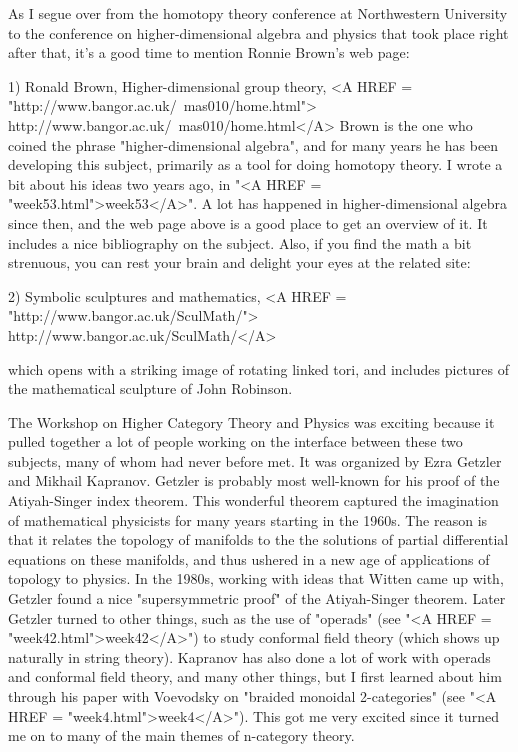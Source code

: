 

As I segue over from the homotopy theory conference at Northwestern
University to the conference on higher-dimensional algebra and physics
that took place right after that, it's a good time to mention Ronnie
Brown's web page:

1) Ronald Brown, Higher-dimensional group theory,
<A HREF = "http://www.bangor.ac.uk/~mas010/home.html">
http://www.bangor.ac.uk/~mas010/home.html</A>
Brown is the one who coined the phrase "higher-dimensional algebra", and
for many years he has been developing this subject, primarily as a tool
for doing homotopy theory.  I wrote a bit about his ideas two years ago,
in "<A HREF = "week53.html">week53</A>".  A lot has happened in higher-dimensional algebra since
then, and the web page above is a good place to get an overview of it.
It includes a nice bibliography on the subject.  Also, if you find the
math a bit strenuous, you can rest your brain and delight your eyes at
the related site:

2) Symbolic sculptures and mathematics,
<A HREF = "http://www.bangor.ac.uk/SculMath/">
http://www.bangor.ac.uk/SculMath/</A>

which opens with a striking image of rotating linked tori, and includes
pictures of the mathematical sculpture of John Robinson.

The Workshop on Higher Category Theory and Physics was exciting because
it pulled together a lot of people working on the interface between
these two subjects, many of whom had never before met.  It was organized
by Ezra Getzler and Mikhail Kapranov.  Getzler is probably most well-known
for his proof of the Atiyah-Singer index theorem.  This wonderful
theorem captured the imagination of mathematical physicists for many
years starting in the 1960s.  The reason is that it relates the topology
of manifolds to the the solutions of partial differential equations
on these manifolds, and thus ushered in a new age of applications of
topology to physics.  In the 1980s, working with ideas that Witten
came up with, Getzler found a nice "supersymmetric proof" of the 
Atiyah-Singer theorem.   Later Getzler turned to other things, such
as the use of "operads" (see "<A HREF = "week42.html">week42</A>") to study conformal field 
theory (which shows up naturally in string theory).  Kapranov has
also done a lot of work with operads and conformal field theory, and
many other things, but I first learned about him through his paper
with Voevodsky on "braided monoidal 2-categories" (see "<A HREF = "week4.html">week4</A>").  This 
got me very excited since it turned me on to many of the main themes of 
n-category theory.  

